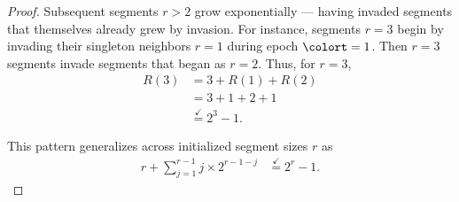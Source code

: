 \begin{proof}
Subsequent segments $r>2$ grow exponentially --- having invaded segments that themselves already grew by invasion.
For instance, segments $r=3$ begin by invading their singleton neighbors $r=1$ during epoch $\colort=1$.
Then $r=3$ segments invade segments that began as $r=2$.
Thus, for $r=3$,
\begin{align*}
R(3)
&= 3 + R(1) + R(2)\\
&= 3 + 1 + 2 + 1\\
&\stackrel{\checkmark}{=} 2^3 - 1.
\end{align*}

This pattern generalizes across initialized segment sizes $r$ as
\begin{align*}
r + \sum_{j=1}^{r-1} j \times 2^{r-1-j}
&\stackrel{\checkmark}{=} 2^{r} - 1.
\end{align*}

\end{proof}



